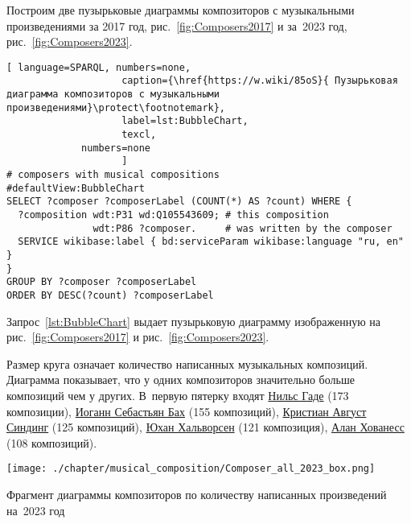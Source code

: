 Построим  две пузырьковые диаграммы композиторов с музыкальными произведениями за 2017 год, рис.~\ref{fig:Composers2017} и за~2023 год, рис.~\ref{fig:Composers2023}.

\begin{lstlisting}[ language=SPARQL, numbers=none,
                    caption={\href{https://w.wiki/85oS}{ Пузырьковая диаграмма композиторов с музыкальными произведениями}\protect\footnotemark},
                    label=lst:BubbleChart,
                    texcl,
	         numbers=none
                    ]
# composers with musical compositions
#defaultView:BubbleChart
SELECT ?composer ?composerLabel (COUNT(*) AS ?count) WHERE {
  ?composition wdt:P31 wd:Q105543609; # this composition
               wdt:P86 ?composer.     # was written by the composer
  SERVICE wikibase:label { bd:serviceParam wikibase:language "ru, en" }
}
GROUP BY ?composer ?composerLabel
ORDER BY DESC(?count) ?composerLabel
\end{lstlisting}%


Запрос~\ref{lst:BubbleChart} выдает пузырьковую диаграмму изображенную на рис.~\ref{fig:Composers2017} и рис.~\ref{fig:Composers2023}.

Размер круга означает количество написанных музыкальных композиций. Диаграмма показывает, что у одних композиторов значительно больше композиций чем у других. В~первую пятерку входят \href{https://ru.wikipedia.org/wiki/Гаде,_Нильс}{Нильс Гаде} (\num{173} композиции), \href{https://ru.wikipedia.org/wiki/Бах,_Иоганн_Себастьян}{Иоганн Себастьян Бах} (\num{155} композиций), \href{https://ru.wikipedia.org/wiki/Синдинг,_Кристиан_Август}{Кристиан Август Синдинг} (\num{125} композиций), \href{https://ru.wikipedia.org/wiki/Хальворсен,_Юхан}{Юхан Хальворсен} (\num{121} композиция), \href{https://ru.wikipedia.org/wiki/Хованесс,_Алан}{Алан Хованесс} (\num{108} композиций).

%
%
\begin{marginfigure}
  \texttt{[image: ./chapter/musical\_composition/Composer\_all\_2023\_box.png]}
  \vspace{-7pt}
  \caption[Пузырьковая диаграмма композиторов по количеству написанных композиций на~2023 год]
    {Фрагмент диаграммы композиторов по количеству написанных произведений на~2023 год}%
  \label{fig:Composers2023}%
\end{marginfigure}

